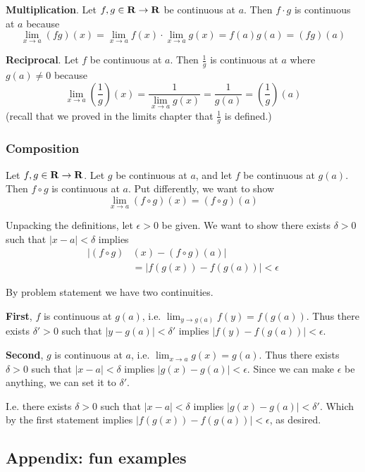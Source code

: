 \textbf{Multiplication}. Let $f,g\in\mathbf{R}\to\mathbf{R}$ be continuous at $a$. Then
$f\cdot g$ is continuous at $a$ because
\[\lim_{x\to a}(fg)(x)=\lim_{x\to a}f(x)\cdot\lim_{x\to a}g(x)=f(a)g(a)=(fg)(a)\]

\textbf{Reciprocal}. Let $f$ be continuous at $a$. Then $\frac{1}{g}$
is continuous at $a$ where $g(a)\neq 0$ because
\[\lim_{x\to a}\left(\frac{1}{g}\right)(x)=\frac{1}{\lim_{x\to a}g(x)}=\frac{1}{g(a)}=\left(\frac{1}{g}\right)(a)\]
(recall that we proved in the limits chapter that $\frac{1}{g}$ is defined.)

\subsubsection{Composition}

Let $f,g\in\mathbf{R}\to\mathbf{R}$. Let $g$ be continuous at $a$, and let $f$ be
continuous at $g(a)$. Then $f\circ g$ is continuous at $a$. Put
differently, we want to show
\[\lim_{x\to a}(f\circ g)(x)=(f\circ g)(a)\]

Unpacking the definitions, let $\epsilon>0$ be given. We want to show there
exists $\delta>0$ such that $|x-a|<\delta$ implies
\begin{align*}
    |(f\circ g)&(x)-(f\circ g)(a)|\\
    &=|f(g(x))-f(g(a))|<\epsilon
\end{align*}

By problem statement we have two continuities.

\vs

\textbf{First}, $f$ is continuous at $g(a)$, i.e.
$\lim_{y\to g(a)}f(y)=f(g(a))$. Thus there exists $\delta'>0$ such that
$|y-g(a)|<\delta'$ implies $|f(y)-f(g(a))|<\epsilon$.

\vs

\textbf{Second}, $g$ is continuous at $a$, i.e.
$\lim_{x\to a}g(x)=g(a)$. Thus there exists $\delta>0$ such that
$|x-a|<\delta$ implies $|g(x)-g(a)|<\epsilon$. Since we can make
$\epsilon$ be anything, we can set it to $\delta'$.

\vs

I.e. there exists $\delta>0$ such that $|x-a|<\delta$ implies
$|g(x)-g(a)|<\delta'$. Which by the first statement implies
$|f(g(x))-f(g(a))|<\epsilon$, as desired.

\subsection{Appendix: fun examples}

